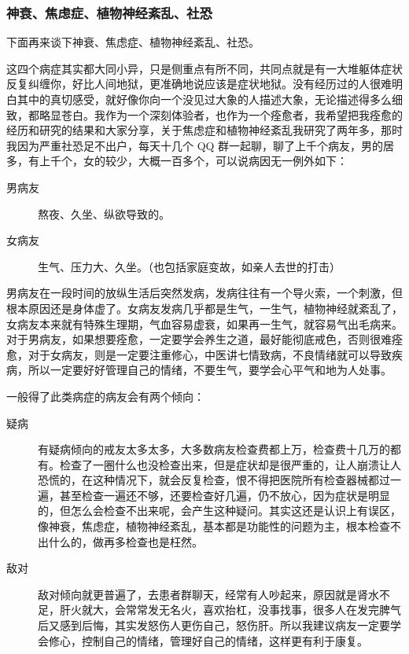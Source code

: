 \subsubsection{神衰、焦虑症、植物神经紊乱、社恐}

下面再来谈下神衰、焦虑症、植物神经紊乱、社恐。

这四个病症其实都大同小异，只是侧重点有所不同，共同点就是有一大堆躯体症状反复纠缠你，好比人间地狱，更准确地说应该是症状地狱。没有经历过的人很难明白其中的真切感受，就好像你向一个没见过大象的人描述大象，无论描述得多么细致，都略显苍白。我作为一个深刻体验者，也作为一个痊愈者，我希望把我痊愈的经历和研究的结果和大家分享，关于焦虑症和植物神经紊乱我研究了两年多，那时我因为严重社恐足不出户，每天十几个 QQ 群一起聊，聊了上千个病友，男的居多，有上千个，女的较少，大概一百多个，可以说病因无一例外如下：

\begin{description}
    \item[男病友] 熬夜、久坐、纵欲导致的。
    \item[女病友] 生气、压力大、久坐。（也包括家庭变故，如亲人去世的打击）
\end{description}

男病友在一段时间的放纵生活后突然发病，发病往往有一个导火索，一个刺激，但根本原因还是身体虚了。女病友发病几乎都是生气，一生气，植物神经就紊乱了，女病友本来就有特殊生理期，气血容易虚衰，如果再一生气，就容易气出毛病来。对于男病友，如果想要痊愈，一定要学会养生之道，最好能彻底戒色，否则很难痊愈，对于女病友，则是一定要注重修心，中医讲七情致病，不良情绪就可以导致疾病，所以一定要好好管理自己的情绪，不要生气，要学会心平气和地为人处事。

一般得了此类病症的病友会有两个倾向：

\begin{description}
    \item[疑病] 有疑病倾向的戒友太多太多，大多数病友检查费都上万，检查费十几万的都有。检查了一圈什么也没检查出来，但是症状却是很严重的，让人崩溃让人恐慌的，在这种情况下，就会反复检查，恨不得把医院所有检查器械都过一遍，甚至检查一遍还不够，还要检查好几遍，仍不放心，因为症状是明显的，但怎么会检查不出来呢，会产生这种疑问。其实这还是认识上有误区，像神衰，焦虑症，植物神经紊乱，基本都是功能性的问题为主，根本检查不出什么的，做再多检查也是枉然。
    \item[敌对] 敌对倾向就更普遍了，去患者群聊天，经常有人吵起来，原因就是肾水不足，肝火就大，会常常发无名火，喜欢抬杠，没事找事，很多人在发完脾气后又感到后悔，其实发怒伤人更伤自己，怒伤肝。所以我建议病友一定要学会修心，控制自己的情绪，管理好自己的情绪，这样更有利于康复。
\end{description}


